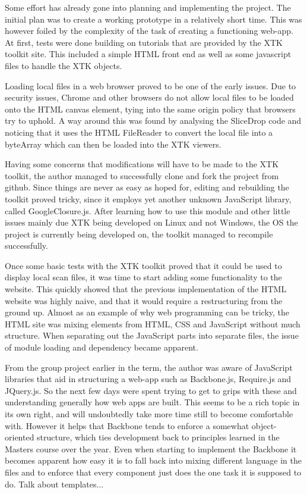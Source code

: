 \documentclass[a4paper,11pt,titlepage]{article}
\begin{document}
Some effort has already gone into planning and implementing the project. The initial plan was to create a working prototype in a relatively short time. This was however foiled by the complexity of the task of creating a functioning web-app. At first, tests were done building on tutorials that are provided by the XTK toolkit site. This included a simple HTML front end as well as some javascript files to handle the XTK objects.

Loading local files in a web browser proved to be one of the early issues. Due to security issues, Chrome and other browsers do not allow local files to be loaded onto the HTML canvas element, tying into the same origin policy that browsers try to uphold. A way around this was found by analysing the SliceDrop code and noticing that it uses the HTML FileReader to convert the local file into a byteArray which can then be loaded into the XTK viewers.

Having some concerns that modifications will have to be made to the XTK toolkit, the author managed to successfully clone and fork the project from github. Since things are never as easy as hoped for, editing and rebuilding the toolkit proved tricky, since it employs yet another unknown JavaScript library, called GoogleClosure.js. After learning how to use this module and other little issues mainly due XTK being developed on Linux and not Windows, the OS the project is currently being developed on, the toolkit managed to recompile successfully.

Once some basic tests with the XTK toolkit proved that it could be used to display local scan files, it was time to start adding some functionality to the website. This quickly showed that the previous implementation of the HTML website was highly naive, and that it would require a restructuring from the ground up. Almost as an example of why web programming can be tricky, the HTML site was mixing elements from HTML, CSS and JavaScript without much structure. When separating out the JavaScript parts into separate files, the issue of module loading and dependency became apparent.

From the group project earlier in the term, the author was aware of JavaScript libraries that aid in structuring a web-app such as Backbone.js, Require.js and JQuery.js. So the next few days were spent trying to get to grips with these and understanding generally how web apps are built. This seems to be a rich topic in its own right, and will undoubtedly take more time still to become comfortable with. However it helps that Backbone tends to enforce a somewhat object-oriented structure, which ties development back to principles learned in the Masters course over the year. Even when starting to implement the Backbone it becomes apparent how easy it is to fall back into mixing different language in the files and to enforce that every component just does the one task it is supposed to do. Talk about templates...
\end{document}
